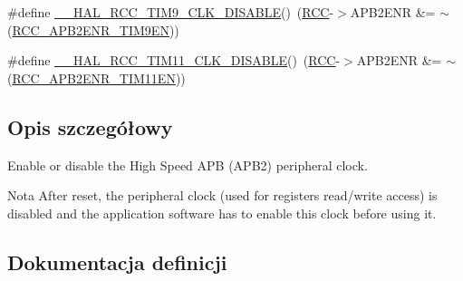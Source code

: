 \begin{DoxyCompactItemize}
\item 
\#define \hyperlink{group___r_c_c___a_p_b2___clock___enable___disable_ga6c858a3c7df429051fe4459a8a22da43}{\+\_\+\+\_\+\+H\+A\+L\+\_\+\+R\+C\+C\+\_\+\+T\+I\+M9\+\_\+\+C\+L\+K\+\_\+\+D\+I\+S\+A\+B\+LE}()~(\hyperlink{group___peripheral__declaration_ga74944438a086975793d26ae48d5882d4}{R\+CC}-\/$>$A\+P\+B2\+E\+NR \&= $\sim$(\hyperlink{group___peripheral___registers___bits___definition_ga987ebd8255dc8f9c09127e1d608d1065}{R\+C\+C\+\_\+\+A\+P\+B2\+E\+N\+R\+\_\+\+T\+I\+M9\+EN}))
\item 
\#define \hyperlink{group___r_c_c___a_p_b2___clock___enable___disable_ga2ea675ace35a7a536c9f4cec522f28bc}{\+\_\+\+\_\+\+H\+A\+L\+\_\+\+R\+C\+C\+\_\+\+T\+I\+M11\+\_\+\+C\+L\+K\+\_\+\+D\+I\+S\+A\+B\+LE}()~(\hyperlink{group___peripheral__declaration_ga74944438a086975793d26ae48d5882d4}{R\+CC}-\/$>$A\+P\+B2\+E\+NR \&= $\sim$(\hyperlink{group___peripheral___registers___bits___definition_gab1d2aeebc8ccf4e2ee18f4d924a35188}{R\+C\+C\+\_\+\+A\+P\+B2\+E\+N\+R\+\_\+\+T\+I\+M11\+EN}))
\end{DoxyCompactItemize}


\subsection{Opis szczegółowy}
Enable or disable the High Speed A\+PB (A\+P\+B2) peripheral clock. 

\begin{DoxyNote}{Nota}
After reset, the peripheral clock (used for registers read/write access) is disabled and the application software has to enable this clock before using it. 
\end{DoxyNote}


\subsection{Dokumentacja definicji}
\mbox{\label{group___r_c_c___a_p_b2___clock___enable___disable_ga80a9e4852bac07d3d9cc6390a361302a}} 
